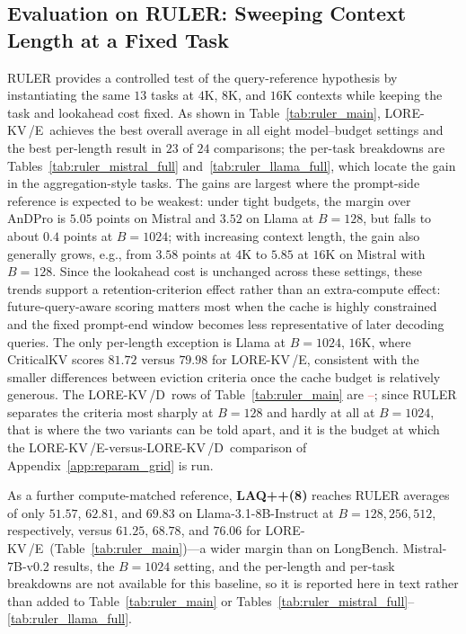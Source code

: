 \documentclass{article} %
\newcommand{\tbd}{\textcolor{red}{--}}
\newcommand{\lorekvE}{LORE-KV\,/E}
\newcommand{\lorekvD}{LORE-KV\,/D}
\begin{document}
\subsection{Evaluation on RULER: Sweeping Context Length at a Fixed Task} \label{subsec:ruler}
RULER provides a controlled test of the query-reference hypothesis by instantiating the same $13$ tasks at $4$K, $8$K, and $16$K contexts while keeping the task and lookahead cost fixed. As shown in Table~\ref{tab:ruler_main}, \lorekvE\ achieves the best overall average in all eight model--budget settings and the best per-length result in $23$ of $24$ comparisons; the per-task breakdowns are Tables~\ref{tab:ruler_mistral_full} and~\ref{tab:ruler_llama_full}, which locate the gain in the aggregation-style tasks. The gains are largest where the prompt-side reference is expected to be weakest: under tight budgets, the margin over AnDPro is $5.05$ points on Mistral and $3.52$ on Llama at $B=128$, but falls to about $0.4$ points at $B=1024$; with increasing context length, the gain also generally grows, e.g., from $3.58$ points at $4$K to $5.85$ at $16$K on Mistral with $B=128$. Since the lookahead cost is unchanged across these settings, these trends support a retention-criterion effect rather than an extra-compute effect: future-query-aware scoring matters most when the cache is highly constrained and the fixed prompt-end window becomes less representative of later decoding queries. The only per-length exception is Llama at $B=1024$, $16$K, where CriticalKV scores $81.72$ versus $79.98$ for \lorekvE, consistent with the smaller differences between eviction criteria once the cache budget is relatively generous. The \lorekvD\ rows of Table~\ref{tab:ruler_main} are \tbd; since RULER separates the criteria most sharply at $B{=}128$ and hardly at all at $B{=}1024$, that is where the two variants can be told apart, and it is the budget at which the \lorekvE-versus-\lorekvD\ comparison of Appendix~\ref{app:reparam_grid} is run.

As a further compute-matched reference, \textbf{LAQ++(8)} \citep{wang2025lookahead} reaches RULER averages of only $51.57$, $62.81$, and $69.83$ on Llama-3.1-8B-Instruct at $B=128,256,512$, respectively, versus $61.25$, $68.78$, and $76.06$ for \lorekvE\ (Table~\ref{tab:ruler_main})---a wider margin than on LongBench. Mistral-7B-v0.2 results, the $B=1024$ setting, and the per-length and per-task breakdowns are not available for this baseline, so it is reported here in text rather than added to Table~\ref{tab:ruler_main} or Tables~\ref{tab:ruler_mistral_full}--\ref{tab:ruler_llama_full}.
\end{document}
